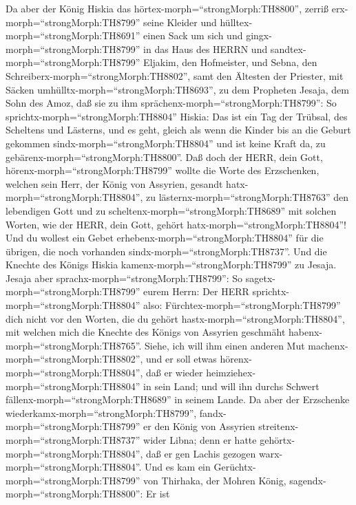  Da aber der König Hiskia das
hörtex-morph=``strongMorph:TH8800'', zerriß
erx-morph=``strongMorph:TH8799'' seine Kleider und
hülltex-morph=``strongMorph:TH8691'' einen Sack um sich und
gingx-morph=``strongMorph:TH8799'' in das Haus des HERRN 
und sandtex-morph=``strongMorph:TH8799'' Eljakim, den Hofmeister, und
Sebna, den Schreiberx-morph=``strongMorph:TH8802'', samt den Ältesten
der Priester, mit Säcken umhülltx-morph=``strongMorph:TH8693'', zu dem
Propheten Jesaja, dem Sohn des Amoz,  daß sie zu ihm
sprächenx-morph=``strongMorph:TH8799'': So
sprichtx-morph=``strongMorph:TH8804'' Hiskia: Das ist ein Tag der
Trübsal, des Scheltens und Lästerns, und es geht, gleich als wenn die
Kinder bis an die Geburt gekommen sindx-morph=``strongMorph:TH8804'' und
ist keine Kraft da, zu gebärenx-morph=``strongMorph:TH8800''.
 Daß doch der HERR, dein Gott,
hörenx-morph=``strongMorph:TH8799'' wollte die Worte des Erzschenken,
welchen sein Herr, der König von Assyrien, gesandt
hatx-morph=``strongMorph:TH8804'', zu
lästernx-morph=``strongMorph:TH8763'' den lebendigen Gott und zu
scheltenx-morph=``strongMorph:TH8689'' mit solchen Worten, wie der HERR,
dein Gott, gehört hatx-morph=``strongMorph:TH8804''! Und du wollest ein
Gebet erhebenx-morph=``strongMorph:TH8804'' für die übrigen, die noch
vorhanden sindx-morph=``strongMorph:TH8737''.  Und die
Knechte des Königs Hiskia kamenx-morph=``strongMorph:TH8799'' zu Jesaja.
 Jesaja aber sprachx-morph=``strongMorph:TH8799'': So
sagetx-morph=``strongMorph:TH8799'' eurem Herrn: Der HERR
sprichtx-morph=``strongMorph:TH8804'' also:
Fürchtex-morph=``strongMorph:TH8799'' dich nicht vor den Worten, die du
gehört hastx-morph=``strongMorph:TH8804'', mit welchen mich die Knechte
des Königs von Assyrien geschmäht habenx-morph=``strongMorph:TH8765''.
 Siehe, ich will ihm einen anderen Mut
machenx-morph=``strongMorph:TH8802'', und er soll etwas
hörenx-morph=``strongMorph:TH8804'', daß er wieder
heimziehex-morph=``strongMorph:TH8804'' in sein Land; und will ihn
durchs Schwert fällenx-morph=``strongMorph:TH8689'' in seinem Lande.
 Da aber der Erzschenke
wiederkamx-morph=``strongMorph:TH8799'',
fandx-morph=``strongMorph:TH8799'' er den König von Assyrien
streitenx-morph=``strongMorph:TH8737'' wider Libna; denn er hatte
gehörtx-morph=``strongMorph:TH8804'', daß er gen Lachis gezogen
warx-morph=``strongMorph:TH8804''.  Und es kam ein
Gerüchtx-morph=``strongMorph:TH8799'' von Thirhaka, der Mohren König,
sagendx-morph=``strongMorph:TH8800'': Er ist
